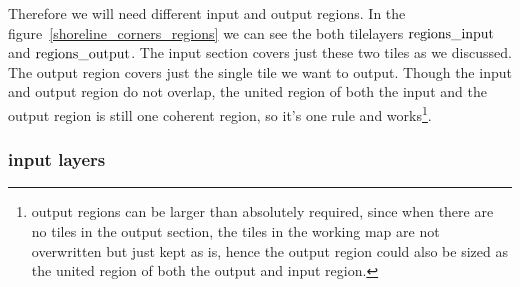 Therefore we will need different input and output regions. In the figure~\ref{shoreline_corners_regions}
we can see the both tilelayers $\textup{regions}\_\textup{input}$ and
$\textup{regions}\_\textup{output}$. The input section covers just these
two tiles as we discussed. The output region covers just the single tile
we want to output. Though the input and output region do not overlap,
the united region of both the input and the output region is still one coherent
region, so it's one rule and works\footnote{output regions can be larger
than absolutely required, since when there are no tiles in the output section,
the tiles in the working map are not overwritten but just kept as is, hence
the output region could also be sized as the united region of both the
output and input region.}.

\newpage
\subsubsection{input layers}

